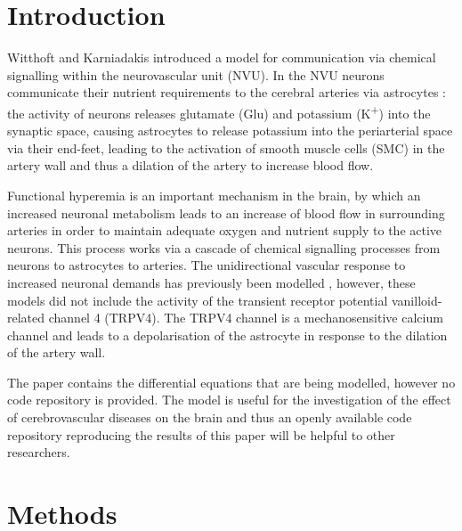 \documentclass[10pt,a4paper,onecolumn]{article}
\begin{document}
\section{Introduction}\label{introduction}

Witthoft and Karniadakis \autocite{Witthoft2012} introduced a model for
communication via chemical signalling within the neurovascular unit
(NVU). In the NVU neurons communicate their nutrient requirements to the
cerebral arteries via astrocytes \autocite{Nelson2015}: the activity of
neurons releases glutamate (Glu) and potassium (K\textsuperscript{+})
into the synaptic space, causing astrocytes to release potassium into
the periarterial space via their end-feet, leading to the activation of
smooth muscle cells (SMC) in the artery wall and thus a dilation of the
artery to increase blood flow.

Functional hyperemia is an important mechanism in the brain, by which an
increased neuronal metabolism leads to an increase of blood flow in
surrounding arteries in order to maintain adequate oxygen and nutrient
supply to the active neurons. This process works via a cascade of
chemical signalling processes from neurons to astrocytes to arteries.
The unidirectional vascular response to increased neuronal demands has
previously been modelled \autocite{Bennett2008}\autocite{Farr2011},
however, these models did not include the activity of the transient
receptor potential vanilloid-related channel 4 (TRPV4). The TRPV4
channel is a mechanosensitive calcium channel and leads to a
depolarisation of the astrocyte in response to the dilation of the
artery wall.

The paper \autocite{Witthoft2012} contains the differential equations
that are being modelled, however no code repository is provided. The
model is useful for the investigation of the effect of cerebrovascular
diseases on the brain and thus an openly available code repository
reproducing the results of this paper will be helpful to other
researchers.

\section{Methods}\label{methods}
\end{document}
